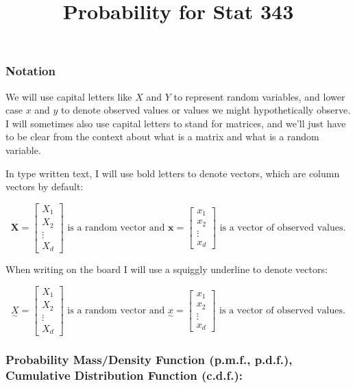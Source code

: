 \documentclass[]{article}
\title{Probability for Stat 343}
\author{}
\date{}
\begin{document}
\maketitle

\subsubsection{Notation}\label{notation}

We will use capital letters like \(X\) and \(Y\) to represent random
variables, and lower case \(x\) and \(y\) to denote observed values or
values we might hypothetically observe. I will sometimes also use
capital letters to stand for matrices, and we'll just have to be clear
from the context about what is a matrix and what is a random variable.

In type written text, I will use bold letters to denote vectors, which
are column vectors by default:

\[\mathbf{X} = \begin{bmatrix}X_1 \\ X_2 \\ \vdots \\ X_d\end{bmatrix} \text{ is a random vector and } \mathbf{x} = \begin{bmatrix}x_1 \\ x_2 \\ \vdots \\ x_d\end{bmatrix} \text{ is a vector of observed values.}\]

When writing on the board I will use a squiggly underline to denote
vectors:

\[\underset{\sim}{X} = \begin{bmatrix}X_1 \\ X_2 \\ \vdots \\ X_d\end{bmatrix} \text{ is a random vector and } \underset{\sim}{x} = \begin{bmatrix}x_1 \\ x_2 \\ \vdots \\ x_d\end{bmatrix} \text{ is a vector of observed values.}\]

\subsubsection{Probability Mass/Density Function (p.m.f., p.d.f.),
Cumulative Distribution Function
(c.d.f.):}\label{probability-massdensity-function-p.m.f.-p.d.f.-cumulative-distribution-function-c.d.f.}
\end{document}
